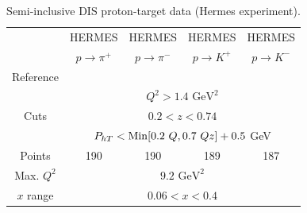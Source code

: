 \documentclass[aps,preprintnumbers,showpacs,nofootinbib,superscriptaddress,floatfix]{revtex4}
\newcommand{\Tperp}{T}
\begin{document}
\begin{table}[h!]
\begin{center}
\begin{tabular}{|c|c|c|c|c|}
 \hline
  & HERMES & HERMES & HERMES & HERMES \\
 ~          &  $p \to \pi^+$    &   $p \to \pi^-$    &  $p \to K^+$    &   $p \to K^-$               \\
 \hline
 Reference & \multicolumn{4}{c|}{\cite{Airapetian:2012ki}}        \\
\hline
\multirow{3}{*}{Cuts}             & \multicolumn{4}{c|}{$Q^2 > 1.4 \text{ GeV}^2$}     \\
             & \multicolumn{4}{c|}{$0.2 <z <0.74$}     \\
             & \multicolumn{4}{c|}{$P_{h \Tperp}< {\rm Min}[0.2\ Q, 0.7 \ Q z ] +0.5$ GeV}     \\
\hline
 Points         &  190 & 190 & 189 & 187       \\
 \hline
Max. $Q^2$      &  \multicolumn{4}{c|}{$9.2 \text{ GeV}^2 $}               \\
 \hline
$x$ range       & \multicolumn{4}{c|}{$0.06 < x < 0.4$ }                \\
\hline
\end{tabular}
\caption{Semi-inclusive DIS proton-target data (Hermes experiment).}
\label{t:data_SIDIS_proton}
\end{center}
\end{table}
\end{document}
